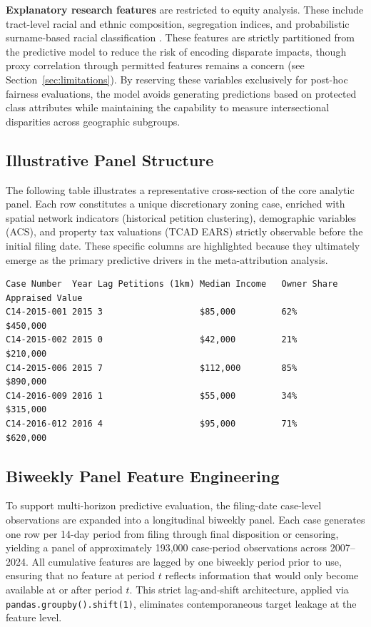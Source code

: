 \documentclass[11pt, letterpaper, oneside]{article}
\begin{document}
\textbf{Explanatory research features} are restricted to equity analysis. These include tract-level racial and ethnic composition, segregation indices, and probabilistic surname-based racial classification \cite{sood2018ethnicolr}. These features are strictly partitioned from the predictive model to reduce the risk of encoding disparate impacts, though proxy correlation through permitted features remains a concern (see Section~\ref{sec:limitations}). By reserving these variables exclusively for post-hoc fairness evaluations, the model avoids generating predictions based on protected class attributes while maintaining the capability to measure intersectional disparities across geographic subgroups.

\subsection{Illustrative Panel Structure}
\label{sec:panel}

\noindent The following table illustrates a representative cross-section of the core analytic panel. Each row constitutes a unique discretionary zoning case, enriched with spatial network indicators (historical petition clustering), demographic variables (ACS), and property tax valuations (TCAD EARS) strictly observable before the initial filing date. These specific columns are highlighted because they ultimately emerge as the primary predictive drivers in the meta-attribution analysis.

\vspace{1em}
{\small
\begin{verbatim}
Case Number  Year Lag Petitions (1km) Median Income   Owner Share   Appraised Value 
C14-2015-001 2015 3                   $85,000         62%           $450,000        
C14-2015-002 2015 0                   $42,000         21%           $210,000        
C14-2015-006 2015 7                   $112,000        85%           $890,000        
C14-2016-009 2016 1                   $55,000         34%           $315,000        
C14-2016-012 2016 4                   $95,000         71%           $620,000        
\end{verbatim}
}


\subsection{Biweekly Panel Feature Engineering}
\label{sec:biweekly_features}

To support multi-horizon predictive evaluation, the filing-date case-level observations are expanded into a longitudinal biweekly panel. Each case generates one row per 14-day period from filing through final disposition or censoring, yielding a panel of approximately 193,000 case-period observations across 2007--2024. All cumulative features are lagged by one biweekly period prior to use, ensuring that no feature at period $t$ reflects information that would only become available at or after period $t$. This strict lag-and-shift architecture, applied via \texttt{pandas.groupby().shift(1)}, eliminates contemporaneous target leakage at the feature level.
\end{document}
